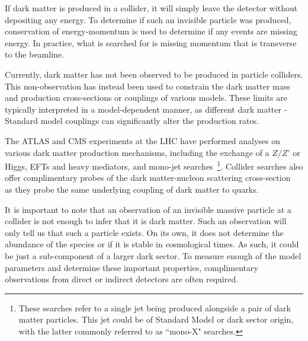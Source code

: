 If dark matter is produced in a collider, it will simply leave the 
detector without depositing any energy. 
To determine if such an invisible particle was produced, 
conservation of energy-momentum is used to determine if 
any events are missing energy. In practice, what 
is searched for is missing momentum that is transverse to the beamline.

Currently, dark matter has not been observed to be produced in particle colliders. This non-observation has instead been used to constrain the dark matter mass and production cross-sections or couplings of various models. 
These limits are typically interpreted in a model-dependent manner, as different dark matter - Standard model couplings can significantly alter the production rates.

 The ATLAS and CMS experiments at the LHC have performed analyses on various dark matter production mechanisms, including the exchange of a $Z/Z'$ or Higgs, EFTs and heavy mediators, and mono-jet searches~\cite{CMS:2017jdm_jul_Searchdarkmatter}\footnote{These searches refer to a single jet being produced alongside a pair of dark matter particles. This jet could be of Standard Model or dark sector origin, with the latter commonly referred to as ``mono-X" searches.}. Collider searches also offer complimentary probes of the dark matter-nucleon scattering cross-section~\cite{Ruppin:2014bra_oct_Complementaritydarkmatter} as they probe the same underlying coupling of dark matter to quarks.  
 
 It is important to note that an observation of an invisible massive particle at a collider is not enough to infer that it is dark matter. Such an observation will only tell us that such a particle exists. On its own, it does not determine the abundance of the species or if it is stable in cosmological times. As such, it could be just a sub-component of a larger dark sector. To measure enough of the model parameters and determine these important properties, complimentary observations from direct or indirect detectors are often required. 
 
